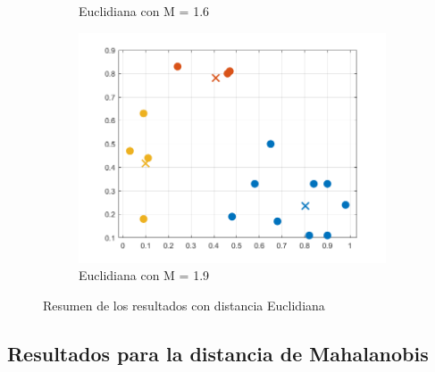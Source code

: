 \documentclass[11pt, letterpaper]{article}
\begin{document}
\begin{figure}[h!]
\begin{subfigure}[b]{0.50\textwidth}
		\caption{Euclidiana con  M = 1.6}
		\label{fig:r2}
	\end{subfigure}
	\vspace{\baselineskip} %
	\begin{subfigure}[b]{0.50\textwidth}
		\includegraphics[width=\textwidth]{IMG/R13.png}
		\caption{Euclidiana con  M = 1.9}
		\label{fig:r3}
	\end{subfigure}\hfill
	\caption{Resumen de los resultados con distancia Euclidiana}
	\label{fig:cuadro_r}
\end{figure}

\newpage

\subsection{Resultados para la distancia de Mahalanobis}
\end{document}
